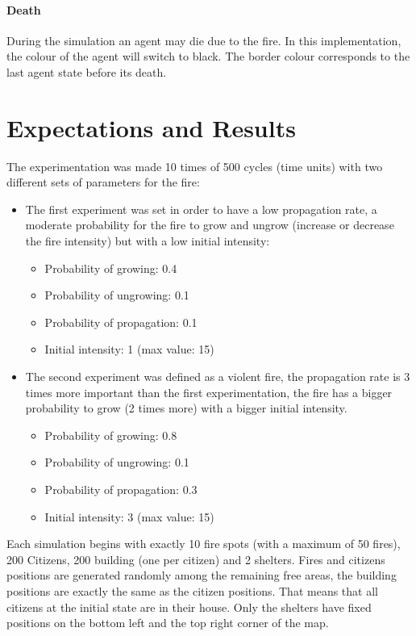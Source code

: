 \documentclass[12pt, a4paper]{memoir} %
\begin{document}
			\subsubsection{Death}
				During the simulation an agent may die due to the fire.
				In this implementation, the colour of the agent will switch to black.
				The border colour corresponds to the last agent state before its death.

\chapter{Expectations and Results}

	The experimentation was made 10 times of 500 cycles (time units) with two different sets of parameters for the fire:
	\begin{itemize}
		\item The first experiment was set in order to have a low propagation rate, a moderate probability for
		the fire to grow and ungrow (increase or decrease the fire intensity) but with a low initial intensity:
		\begin{itemize}
			\item Probability of growing: 0.4
			\item Probability of ungrowing: 0.1
			\item Probability of propagation: 0.1
			\item Initial intensity: 1 (max value: 15)
		\end{itemize}
		\item The second experiment was defined as a violent fire, the propagation rate is 3 times more important than
		the first experimentation, the fire has a bigger probability to grow (2 times more) with a bigger initial intensity.
		\begin{itemize}
			\item Probability of growing: 0.8
			\item Probability of ungrowing: 0.1
			\item Probability of propagation: 0.3
			\item Initial intensity: 3 (max value: 15)
		\end{itemize}
	\end{itemize}

	Each simulation begins with exactly 10 fire spots (with a maximum of 50 fires), 200 Citizens, 200 building (one per citizen) and 2 shelters.
	Fires and citizens positions are generated randomly among the remaining free areas, the building positions are exactly the same
	as the citizen positions. That means that all citizens at the initial state are in their house. Only the shelters have
	fixed positions on the bottom left and the top right corner of the map.
\end{document}
